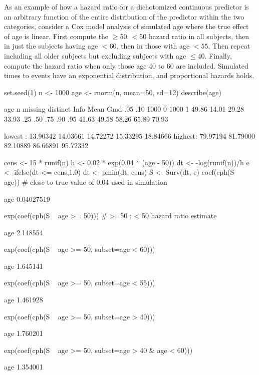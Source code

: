As an example of how a hazard ratio for a dichotomized continuous
predictor is an arbitrary function of the entire distribution of the
predictor within the two categories, consider a Cox model analysis of
simulated age where the true effect of age is linear.  First compute
the $\geq 50:< 50$ hazard ratio in all subjects, then in just the
subjects having age $< 60$, then in those with age $< 55$.  Then
repeat including all older subjects but excluding subjects with age
$\leq 40$.  Finally, compute the hazard ratio when only those age 40
to 60 are included.  Simulated times to events have an
exponential distribution, and proportional hazards holds.
\begin{Schunk}
\begin{Sinput}
set.seed(1)
n <- 1000
age <- rnorm(n, mean=50, sd=12)
describe(age)
\end{Sinput}
\begin{Soutput}
age 
       n  missing distinct     Info     Mean      Gmd      .05      .10 
    1000        0     1000        1    49.86    14.01    29.28    33.93 
     .25      .50      .75      .90      .95 
   41.63    49.58    58.26    65.89    70.93 

lowest : 13.90342 14.03661 14.72272 15.33295 18.84666
highest: 79.97194 81.79000 82.10889 86.66891 95.72332
\end{Soutput}
\begin{Sinput}
cens <- 15 * runif(n)
h  <- 0.02 * exp(0.04 * (age - 50))
dt <- -log(runif(n))/h
e  <- ifelse(dt <= cens,1,0)
dt <- pmin(dt, cens)
S  <- Surv(dt, e)
coef(cph(S ~ age))   # close to true value of 0.04 used in simulation
\end{Sinput}
\begin{Soutput}
       age 
0.04027519 
\end{Soutput}
\begin{Sinput}
exp(coef(cph(S ~ age >= 50)))   # >=50 : < 50 hazard ratio estimate
\end{Sinput}
\begin{Soutput}
     age 
2.148554 
\end{Soutput}
\begin{Sinput}
exp(coef(cph(S ~ age >= 50, subset=age < 60)))
\end{Sinput}
\begin{Soutput}
     age 
1.645141 
\end{Soutput}
\begin{Sinput}
exp(coef(cph(S ~ age >= 50, subset=age < 55)))
\end{Sinput}
\begin{Soutput}
     age 
1.461928 
\end{Soutput}
\begin{Sinput}
exp(coef(cph(S ~ age >= 50, subset=age > 40)))
\end{Sinput}
\begin{Soutput}
     age 
1.760201 
\end{Soutput}
\begin{Sinput}
exp(coef(cph(S ~ age >= 50, subset=age > 40 & age < 60)))
\end{Sinput}
\begin{Soutput}
     age 
1.354001 
\end{Soutput}
\end{Schunk}

